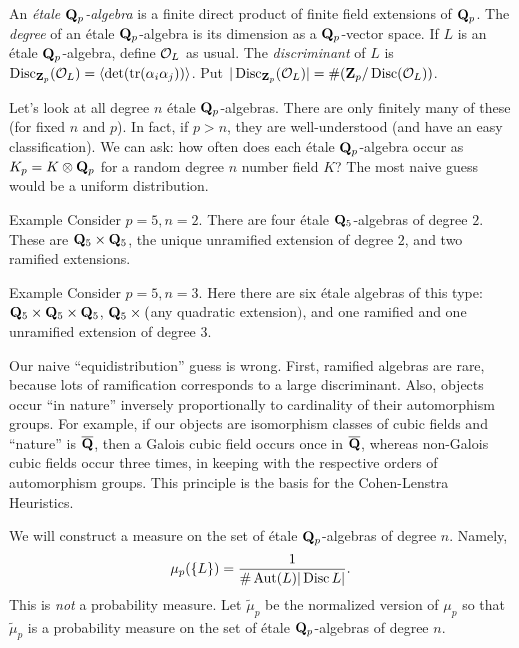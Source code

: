 \begin{defi}
An \emph{\'etale $\mathbf{Q}_p$-algebra} is a finite direct product of finite field 
extensions of $\mathbf{Q}_p$. The \emph{degree} of an \'etale $\mathbf{Q}_p$-algebra is its 
dimension as a $\mathbf{Q}_p$-vector space. If $L$ is an \'etale $\mathbf{Q}_p$-algebra, 
define $\mathcal{O}_L$ as usual. The \emph{discriminant} of $L$ is 
$\operatorname{Disc}_{\mathbf{Z}_p}(\mathcal{O}_L) = \langle \det(\operatorname{tr}(\alpha_i \alpha_j))\rangle$.
Put $|\operatorname{Disc}_{\mathbf{Z}_p}(\mathcal{O}_L)| = \#(\mathbf{Z}_p/\operatorname{Disc}(\mathcal{O}_L))$.  
\end{defi}

Let's look at all degree $n$ \'etale $\mathbf{Q}_p$-algebras. There are only finitely 
many of these (for fixed $n$ and $p$). In fact, if $p>n$, they are 
well-understood (and have an easy classification). We can ask: how often does 
each \'etale $\mathbf{Q}_p$-algebra occur as $K_p=K\otimes\mathbf{Q}_p$ for a random degree 
$n$ number field $K$? The most naive guess would be a uniform distribution. 

\begin{enonce}[remark]{Example}
Consider $p=5,n=2$. There are four \'etale $\mathbf{Q}_5$-algebras of degree $2$. 
These are $\mathbf{Q}_5\times \mathbf{Q}_5$, the unique unramified extension of degree $2$, 
and two ramified extensions. 
\end{enonce}

\begin{enonce}[remark]{Example}
Consider $p=5,n=3$. Here there are six \'etale algebras of this type: 
$\mathbf{Q}_5\times \mathbf{Q}_5\times \mathbf{Q}_5$, $\mathbf{Q}_5\times($any quadratic extension$)$, and one 
ramified and one unramified extension of degree $3$.
\end{enonce}

Our naive ``equidistribution'' guess is wrong. First, ramified algebras are 
rare, because lots of ramification corresponds to a large discriminant. Also, 
objects occur ``in nature'' inversely proportionally to cardinality of their 
automorphism groups. For example, if our objects are isomorphism classes of 
cubic fields and ``nature'' is $\overline{\mathbf{Q}}$, then a Galois cubic field
occurs once in $\overline{\mathbf{Q}}$, whereas non-Galois cubic fields occur three 
times, in keeping with the respective orders of automorphism groups. This 
principle is the basis for the Cohen-Lenstra Heuristics. 

We will construct a measure on the set of \'etale $\mathbf{Q}_p$-algebras of degree 
$n$. Namely, 
\[
  \mu_p(\{L\}) = \frac{1}{\# \operatorname{Aut}(L)|\operatorname{Disc} L|} .
\]
This is \emph{not} a probability measure. Let $\widetilde \mu_p$ be the 
normalized version of $\mu_p$ so that $\widetilde\mu_p$ is a probability 
measure on the set of \'etale $\mathbf{Q}_p$-algebras of degree $n$. 

